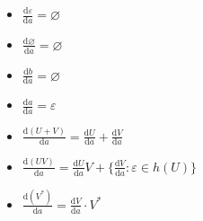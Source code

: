 \begin{itemize}
\begin{itemize}
		\item $\frac{\text{d}\varepsilon}{\text{d}a} = \varnothing$
		\item $\frac{\text{d}\varnothing}{\text{d}a} = \varnothing$
		\item $\frac{\text{d}b}{\text{d}a} = \varnothing$
		\item $\frac{\text{d}a}{\text{d}a} = \varepsilon$
		\item $\frac{\text{d}(U + V)}{\text{d}a} = \frac{\text{d}U}{\text{d}a} + \frac{\text{d}V}{\text{d}a}$
		\item $\frac{\text{d}(UV)}{\text{d}a} = \frac{\text{d}U}{\text{d}a}V + \{\frac{\text{d}V}{\text{d}a}:\varepsilon \in h(U)\}$
		\item $\frac{\text{d}(V^*)}{\text{d}a} = \frac{\text{d}V}{\text{d}a}\cdot V^*$
	\end{itemize}
\end{itemize}

